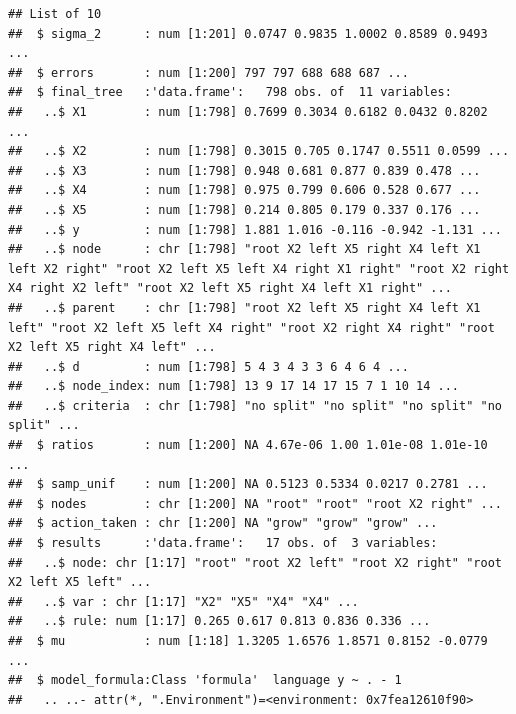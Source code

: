 \documentclass[]{article}
\begin{document}
\begin{verbatim}
## List of 10
##  $ sigma_2      : num [1:201] 0.0747 0.9835 1.0002 0.8589 0.9493 ...
##  $ errors       : num [1:200] 797 797 688 688 687 ...
##  $ final_tree   :'data.frame':   798 obs. of  11 variables:
##   ..$ X1        : num [1:798] 0.7699 0.3034 0.6182 0.0432 0.8202 ...
##   ..$ X2        : num [1:798] 0.3015 0.705 0.1747 0.5511 0.0599 ...
##   ..$ X3        : num [1:798] 0.948 0.681 0.877 0.839 0.478 ...
##   ..$ X4        : num [1:798] 0.975 0.799 0.606 0.528 0.677 ...
##   ..$ X5        : num [1:798] 0.214 0.805 0.179 0.337 0.176 ...
##   ..$ y         : num [1:798] 1.881 1.016 -0.116 -0.942 -1.131 ...
##   ..$ node      : chr [1:798] "root X2 left X5 right X4 left X1 left X2 right" "root X2 left X5 left X4 right X1 right" "root X2 right X4 right X2 left" "root X2 left X5 right X4 left X1 right" ...
##   ..$ parent    : chr [1:798] "root X2 left X5 right X4 left X1 left" "root X2 left X5 left X4 right" "root X2 right X4 right" "root X2 left X5 right X4 left" ...
##   ..$ d         : num [1:798] 5 4 3 4 3 3 6 4 6 4 ...
##   ..$ node_index: num [1:798] 13 9 17 14 17 15 7 1 10 14 ...
##   ..$ criteria  : chr [1:798] "no split" "no split" "no split" "no split" ...
##  $ ratios       : num [1:200] NA 4.67e-06 1.00 1.01e-08 1.01e-10 ...
##  $ samp_unif    : num [1:200] NA 0.5123 0.5334 0.0217 0.2781 ...
##  $ nodes        : chr [1:200] NA "root" "root" "root X2 right" ...
##  $ action_taken : chr [1:200] NA "grow" "grow" "grow" ...
##  $ results      :'data.frame':   17 obs. of  3 variables:
##   ..$ node: chr [1:17] "root" "root X2 left" "root X2 right" "root X2 left X5 left" ...
##   ..$ var : chr [1:17] "X2" "X5" "X4" "X4" ...
##   ..$ rule: num [1:17] 0.265 0.617 0.813 0.836 0.336 ...
##  $ mu           : num [1:18] 1.3205 1.6576 1.8571 0.8152 -0.0779 ...
##  $ model_formula:Class 'formula'  language y ~ . - 1
##   .. ..- attr(*, ".Environment")=<environment: 0x7fea12610f90>
\end{verbatim}
\end{document}
